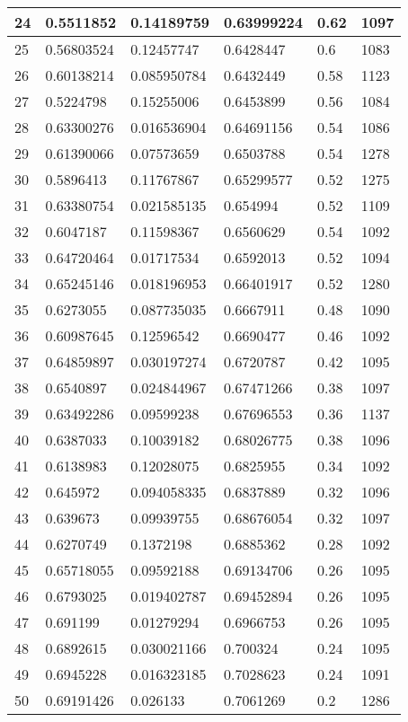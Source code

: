 \begin{longtable}{|l|l|l|l|l|l|}
24 & 0.5511852 & 0.14189759 & 0.63999224 & 0.62 & 1097 \\ \hline 
25 & 0.56803524 & 0.12457747 & 0.6428447 & 0.6 & 1083 \\ \hline 
26 & 0.60138214 & 0.085950784 & 0.6432449 & 0.58 & 1123 \\ \hline 
27 & 0.5224798 & 0.15255006 & 0.6453899 & 0.56 & 1084 \\ \hline 
28 & 0.63300276 & 0.016536904 & 0.64691156 & 0.54 & 1086 \\ \hline 
29 & 0.61390066 & 0.07573659 & 0.6503788 & 0.54 & 1278 \\ \hline 
30 & 0.5896413 & 0.11767867 & 0.65299577 & 0.52 & 1275 \\ \hline 
31 & 0.63380754 & 0.021585135 & 0.654994 & 0.52 & 1109 \\ \hline 
32 & 0.6047187 & 0.11598367 & 0.6560629 & 0.54 & 1092 \\ \hline 
33 & 0.64720464 & 0.01717534 & 0.6592013 & 0.52 & 1094 \\ \hline 
34 & 0.65245146 & 0.018196953 & 0.66401917 & 0.52 & 1280 \\ \hline 
35 & 0.6273055 & 0.087735035 & 0.6667911 & 0.48 & 1090 \\ \hline 
36 & 0.60987645 & 0.12596542 & 0.6690477 & 0.46 & 1092 \\ \hline 
37 & 0.64859897 & 0.030197274 & 0.6720787 & 0.42 & 1095 \\ \hline 
38 & 0.6540897 & 0.024844967 & 0.67471266 & 0.38 & 1097 \\ \hline 
39 & 0.63492286 & 0.09599238 & 0.67696553 & 0.36 & 1137 \\ \hline 
40 & 0.6387033 & 0.10039182 & 0.68026775 & 0.38 & 1096 \\ \hline 
41 & 0.6138983 & 0.12028075 & 0.6825955 & 0.34 & 1092 \\ \hline 
42 & 0.645972 & 0.094058335 & 0.6837889 & 0.32 & 1096 \\ \hline 
43 & 0.639673 & 0.09939755 & 0.68676054 & 0.32 & 1097 \\ \hline 
44 & 0.6270749 & 0.1372198 & 0.6885362 & 0.28 & 1092 \\ \hline 
45 & 0.65718055 & 0.09592188 & 0.69134706 & 0.26 & 1095 \\ \hline 
46 & 0.6793025 & 0.019402787 & 0.69452894 & 0.26 & 1095 \\ \hline 
47 & 0.691199 & 0.01279294 & 0.6966753 & 0.26 & 1095 \\ \hline 
48 & 0.6892615 & 0.030021166 & 0.700324 & 0.24 & 1095 \\ \hline 
49 & 0.6945228 & 0.016323185 & 0.7028623 & 0.24 & 1091 \\ \hline 
50 & 0.69191426 & 0.026133 & 0.7061269 & 0.2 & 1286 \\ \hline 
\end{longtable}